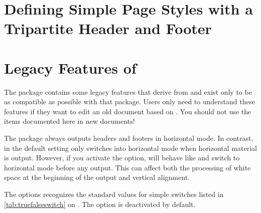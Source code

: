 \section{Defining Simple Page Styles with a Tripartite Header and Footer}


\section{Legacy Features of }

\begin{Explain}
  The  package contains some legacy features that
  derive from  and exist only to be as compatible as possible
  with that package. Users only need to understand these features if they want
  to edit an old document based on . You
  should not use the items documented here in new documents!
\end{Explain}

\begin{Declaration}
\end{Declaration}
The  package always outputs headers and footers in
horizontal mode. In contrast,  in the default
setting only switches into horizontal mode when horizontal material is output.
However, if you activate the  option, 
will behave like  and switch to horizontal mode before any
output. This can affect both the processing of white space at the beginning of
the output and vertical alignment.

The options recognizes the standard values for simple switches listed in
\autoref{tab:truefalseswitch} on . The option
is deactivated by default.%
\EndIndexGroup

%
\EndIndexGroup


